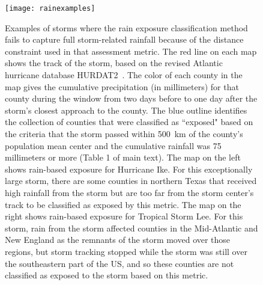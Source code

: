 \documentclass[11pt, titlepage, twoside]{article}
\begin{document}
\begin{figure}[tbhp!]
\centering
\texttt{[image: rainexamples]}
\caption{Examples of storms where the rain exposure classification method fails
to capture full storm-related rainfall because of the distance constraint used
in that assessment metric. The red line on each map shows the track of the
storm, based on the revised Atlantic hurricane database
\ac{HURDAT2}~\citep{landsea2013}. The color of each county in the map gives the
cumulative precipitation (in millimeters) for that county during the window
from two days before to one day after the storm's closest approach to the
county. The blue outline identifies the collection of counties that were
classified as ``exposed" based on the criteria that the storm passed within
500~\si{\kilo\metre} of the county's population mean center and the cumulative
rainfall was 75 millimeters or more (Table 1 of main text). The map on the left
shows rain-based exposure for Hurricane Ike. For this exceptionally large
storm, there are some counties in northern Texas that received high rainfall
from the storm but are too far from the storm center's track to be classified
as exposed by this metric. The map on the right shows rain-based exposure for
Tropical Storm Lee. For this storm, rain from the storm affected counties in
the Mid-Atlantic and New England as the remnants of the storm moved over those
regions, but storm tracking stopped while the storm was still over the
southeastern part of the \ac{US}, and so these counties are not classified as
exposed to the storm based on this metric.}
\label{fig:rainexamples}
\end{figure}

\clearpage


\end{document}
